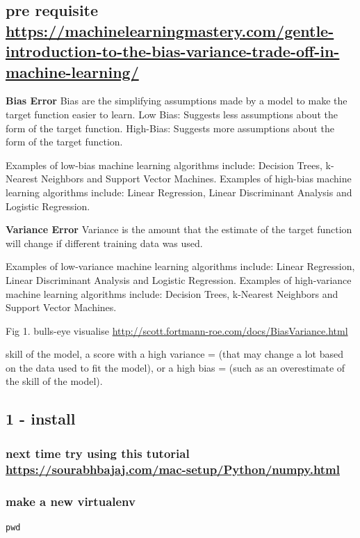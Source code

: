 \documentclass[11pt]{article}
\begin{document}
\subsection{pre requisite \url{https://machinelearningmastery.com/gentle-introduction-to-the-bias-variance-trade-off-in-machine-learning/}}
\label{sec:org3093539}
\textbf{Bias Error}
Bias are the simplifying assumptions made by a model to make the target function easier to learn.
Low Bias: Suggests less assumptions about the form of the target function.
High-Bias: Suggests more assumptions about the form of the target function.

Examples of low-bias machine learning algorithms include: Decision Trees, k-Nearest Neighbors and Support Vector Machines.
Examples of high-bias machine learning algorithms include: Linear Regression, Linear Discriminant Analysis and Logistic Regression.

\textbf{Variance Error}
Variance is the amount that the estimate of the target function will change if different training data was used.

Examples of low-variance machine learning algorithms include: Linear Regression, Linear Discriminant Analysis and Logistic Regression.
Examples of high-variance machine learning algorithms include: Decision Trees, k-Nearest Neighbors and Support Vector Machines.

Fig 1. bulls-eye visualise \url{http://scott.fortmann-roe.com/docs/BiasVariance.html}

skill of the model, a score with 
a high variance = (that may change a lot based on the data used to fit the model), or 
a high bias = (such as an overestimate of the skill of the model).

\subsection{1 - install}
\label{sec:org8ed9320}
\subsubsection{next time try using this tutorial \url{https://sourabhbajaj.com/mac-setup/Python/numpy.html}}
\label{sec:org4e27f0d}
\subsubsection{make a new virtualenv}
\label{sec:orgcc7ef42}
\begin{verbatim}
pwd
\end{verbatim}
\end{document}
